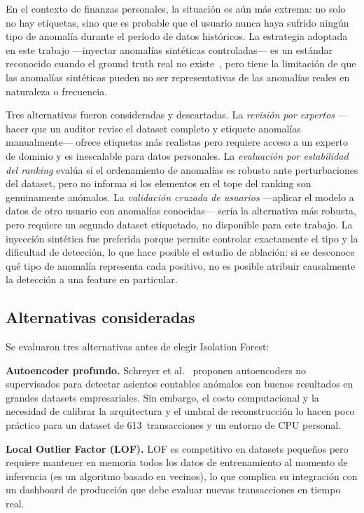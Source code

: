 \documentclass[conference]{IEEEtran}
\begin{document}
En el contexto de finanzas personales, la situaci\'on es a\'un m\'as extrema:
no solo no hay etiquetas, sino que es probable que el usuario nunca haya sufrido
ning\'un tipo de anomal\'ia durante el per\'iodo de datos hist\'oricos. La
estrategia adoptada en este trabajo ---inyectar anomal\'ias sint\'eticas
controladas--- es un est\'andar reconocido cuando el ground truth real no existe~\cite{nguyen2026synthetic},
pero tiene la limitaci\'on de que las anomal\'ias sint\'eticas pueden no ser
representativas de las anomal\'ias reales en naturaleza o frecuencia.

Tres alternativas fueron consideradas y descartadas. La \emph{revisi\'on por expertos}
---hacer que un auditor revise el dataset completo y etiquete anomal\'ias manualmente---
ofrece etiquetas m\'as realistas pero requiere acceso a un experto de dominio y es
inescalable para datos personales. La \emph{evaluaci\'on por estabilidad del ranking}
eval\'ua si el ordenamiento de anomal\'ias es robusto ante perturbaciones del dataset,
pero no informa si los elementos en el tope del ranking son genuinamente an\'omalos.
La \emph{validaci\'on cruzada de usuarios} ---aplicar el modelo a datos de otro usuario
con anomal\'ias conocidas--- ser\'ia la alternativa m\'as robusta, pero requiere un
segundo dataset etiquetado, no disponible para este trabajo. La inyecci\'on sint\'etica
fue preferida porque permite controlar exactamente el tipo y la dificultad de
detecci\'on, lo que hace posible el estudio de ablaci\'on: si se desconoce qu\'e tipo
de anomal\'ia representa cada positivo, no es posible atribuir causalmente la detecci\'on
a una feature en particular.

\subsection{Alternativas consideradas}

Se evaluaron tres alternativas antes de elegir Isolation Forest:

\textbf{Autoencoder profundo.}  Schreyer et al.~\cite{schreyer2017detection} proponen
autoencoders no supervisados para detectar asientos contables an\'omalos con buenos
resultados en grandes datasets empresariales. Sin embargo, el costo computacional y la
necesidad de calibrar la arquitectura y el umbral de reconstrucci\'on lo hacen poco
pr\'actico para un dataset de 613~transacciones y un entorno de CPU personal.

\textbf{Local Outlier Factor (LOF).}  LOF es competitivo en datasets peque\~nos
pero requiere mantener en memoria todos los datos de entrenamiento al momento de
inferencia (es un algoritmo basado en vecinos), lo que complica su integraci\'on con
un dashboard de producci\'on que debe evaluar nuevas transacciones en tiempo real.
\end{document}

